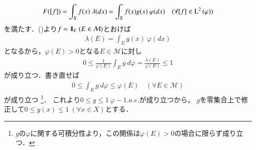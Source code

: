 \begin{prf}
\begin{description}
\begin{align}
			F([f]) = \int_X f(x)\ \lambda(dx) = \int_X f(x)g(x)\ \varphi(dx) \quad (\forall [f] \in \Lp{2}{\varphi})
			\label{eq:lebesgue_radon_nikodym_2}
		\end{align}
		を満たす．()より$f = \mbox{1}\hspace{-0.25em}\mbox{l}_E\ (E \in \mathcal{M})$とおけば
		\begin{align}
			\lambda(E) = \int_E g(x)\ \varphi(dx)
		\end{align}
		となるから，$\varphi(E) > 0$となる$E \in \mathcal{M}$に対し
		\begin{align}
			0 \leq \frac{1}{\varphi(E)} \int_E g\ d\varphi = \frac{\lambda(E)}{\varphi(E)} \leq 1
		\end{align}
		が成り立つ．書き直せば
		\begin{align}
			0 \leq \int_E g\ d\varphi \leq \varphi(E) \quad (\forall E \in \mathcal{M})
		\end{align}
		が成り立つ
		\footnote{
			$g$の$\varphi$に関する可積分性より，この関係は$\varphi(E) > 0$の場合に限らず成り立つ．
		}．
		これより$0 \leq g \leq 1\ \varphi-1.a.e.$が成り立つから，
		$g$を零集合上で修正して$0 \leq g(x) \leq 1\ (\forall x \in X)$とする．
		

\end{description}
\end{prf}
